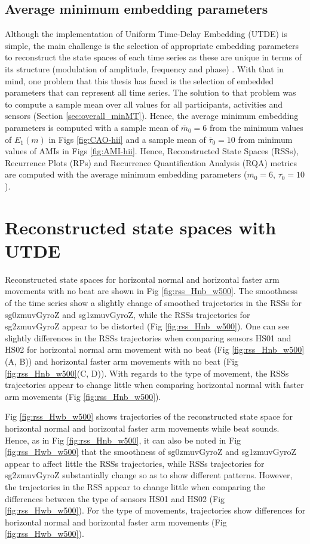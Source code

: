 \newpage
\subsection{Average minimum embedding parameters}
Although the implementation of Uniform Time-Delay Embedding (UTDE) 
is simple, the main challenge is the selection of appropriate embedding 
parameters to reconstruct the state spaces of each time series
as these are unique in terms of its structure (modulation of amplitude, 
frequency and phase) \citep{ frank2010, sama2013, bradley2015}.
With that in mind, one problem that this thesis has faced 
is the selection of embedded parameters that 
can represent all time series. 
The solution to that problem was to compute a sample mean over 
all values for all participants, activities and sensors
(Section \ref{sec:overall_minMT}).
Hence, the average minimum embedding parameters is computed with 
a sample mean of $\overline{m}_0=6$ from the minimum values 
of $E_{1}(m)$ in Figs \ref{fig:CAO-hii} and a sample mean 
of $\overline{\tau}_0=10$ from minimum values of AMIs in Figs \ref{fig:AMI-hii}.
Hence, Reconstructed State Spaces (RSSs), Recurrence Plots (RPs) and
Recurrence Quantification Analysis (RQA) metrics
are computed with the average minimum embedding parameters 
($\overline{m_0}=6$, $\overline{\tau_0}=10$).

\section{Reconstructed state spaces with UTDE}
Reconstructed state spaces for horizontal normal and horizontal faster 
arm movements with no beat are shown in Fig \ref{fig:rss_Hnb_w500}.
The smoothness of the time series show a slightly change of smoothed 
trajectories in the RSSs for sg0zmuvGyroZ and sg1zmuvGyroZ, while the 
RSSs trajectories for sg2zmuvGyroZ appear to be distorted 
(Fig \ref{fig:rss_Hnb_w500}).
One can see slightly differences in the RSSs trajectories when comparing 
sensors HS01 and HS02 for horizontal normal arm movement with no beat 
(Fig \ref{fig:rss_Hnb_w500}(A, B)) and horizontal faster arm movements 
with no beat (Fig \ref{fig:rss_Hnb_w500}(C, D)).
With regards to the type of movement, the RSSs trajectories appear 
to change little when comparing horizontal normal with faster arm movements 
(Fig \ref{fig:rss_Hnb_w500}).

Fig \ref{fig:rss_Hwb_w500} shows trajectories of the reconstructed 
state space for horizontal normal and horizontal faster arm movements 
while beat sounds. Hence, as in Fig \ref{fig:rss_Hnb_w500}, 
it can also be noted in Fig \ref{fig:rss_Hwb_w500} that the smoothness 
of sg0zmuvGyroZ and sg1zmuvGyroZ appear to affect little the RSSs 
trajectories, while RSSs trajectories for sg2zmuvGyroZ substantially change 
so as to show different patterns. However, the trajectories in the RSS 
appear to change little when comparing the differences between the type 
of sensors HS01 and HS02 (Fig \ref{fig:rss_Hwb_w500}).
For the type of movements, trajectories show differences for horizontal
normal and horizontal faster arm movements (Fig \ref{fig:rss_Hwb_w500}).

